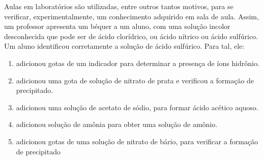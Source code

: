 Aulas em laboratórios são utilizadas, entre outros tantos motivos, para se verificar, experimentalmente, um conhecimento adquirido em sala de aula. Assim, um professor apresenta um béquer a um aluno, com uma solução incolor desconhecida que pode ser de ácido clorídrico, ou ácido nítrico ou ácido sulfúrico. Um aluno identificou corretamente a solução de ácido sulfúrico.  Para tal, ele: 

\begin{enumerate}[label = (\alph*)]	
	\item adicionou gotas de um indicador para determinar a presença de íons hidrônio. 
	\item adicionou uma gota de solução de nitrato de prata e verificou a formação de precipitado. 
	\item adicionou uma solução de acetato de sódio, para formar ácido acético aquoso.
	\item adicionou solução de amônia para obter uma solução de amônio.
	\item adicionou gotas de uma solução de nitrato de bário, para verificar a formação de precipitado
\end{enumerate}
